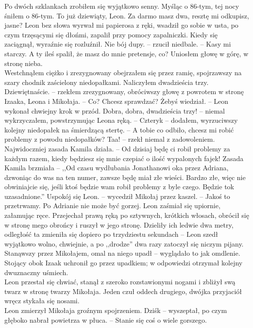 \documentclass[../MAIN.tex]{subfiles}
\begin{document}
Po dwóch szklankach zrobiłem się wyjątkowo senny. Myśląc o 86-tym, tej nocy śniłem o 86-tym.
% 
\sx To już dziewiąty, Leon. Za darmo masz dwa, resztę mi odkupisz, jasne?
\qd
Leon bez słowa wyrwał mi papierosa z ręki, wsadził go sobie w usta, po czym trzęsącymi się dłońmi, zapalił przy pomocy zapalniczki. Kiedy się zaciągnął, wyraźnie się rozluźnił.
\sx Nie bój dupy. -- rzucił niedbale. -- Kasy mi starczy. A ty ileś spalił, że masz do mnie pretensje, co?
\qd
Uniosłem głowę w górę, w stronę nieba.\\
Westchnąłem ciężko i zrezygnowany obejrzałem się przez ramię, spojrzawszy na szary chodnik zaścielony niedopałkami. Naliczyłem dwadzieścia trzy.
\sx Dziewiętnaście. -- rzekłem zrezygnowany, obróciwszy głowę z powrotem w stronę Izaaka, Leona i Mikołaja. -- Co? Chcesz sprawdzać?
\xx Żebyś wiedział. -- Leon wykonał chwiejny krok w przód.
\xx Dobra, dobra, dwadzieścia trzy! -- niemal wykrzyczałem, powstrzymując Leona ręką. -- Cztery\3k -- dodałem, wyrzuciwszy kolejny niedopałek na śmierdzącą stertę. -- A tobie co odbiło, chcesz mi robić problemy z powodu niedopałków?
\xx Taa! -- rzekł niemal z zadowoleniem. Najwidoczniej zasada Kamila działa. -- Od dzisiaj będę ci robił problemy za każdym razem, kiedy będziesz się mnie czepiać o ilość wypalonych fajek!
\qd
Zasada Kamila brzmiała -- ,,Od czasu wydłubania Jonathanowi oka przez Adriana, dzwoniąc do was na ten numer, zawsze będę miał złe wieści. Bardzo złe, więc nie obwiniajcie się, jeśli ktoś będzie wam robił problemy z byle czego. Będzie to\3k uzasadnione.''
\sx Uspokój się Leon. -- wycedził Mikołaj przez kaszel. -- Jakoś to przetrwamy. Po Adrianie nie może być gorzej.
\qd
Leon zaśmiał się upiornie, załamując ręce. Przejechał prawą ręką po sztywnych, krótkich włosach, obrócił się w stronę mego obrońcy i ruszył w jego stronę. Dzieliły ich ledwie dwa metry, odległość ta zmieniła się dopiero po trzydziestu sekundach -- Leon szedł wyjątkowo wolno, chwiejnie, a po ,,drodze'' dwa razy zatoczył się niczym pijany.\\
Stanąwszy przez Mikołajem, omal na niego upadł -- wyglądało to jak omdlenie. Stojący obok Izaak uchronił go przez upadkiem; w odpowiedzi otrzymał kolejny dwuznaczny uśmiech.\\
Leon przestał się chwiać, stanął z szeroko rozstawionymi nogami i zbliżył swą twarz w stronę twarzy Mikołaja. Jeden czuł oddech drugiego, dwójka przyjaciół wręcz stykała się nosami.\\
Leon zmierzył Mikołaja groźnym spojrzeniem.
\sx Dziś\3k -- wyszeptał, po czym głęboko nabrał powietrza w płuca. -- Stanie się coś o wiele gorszego.
\end{document}
